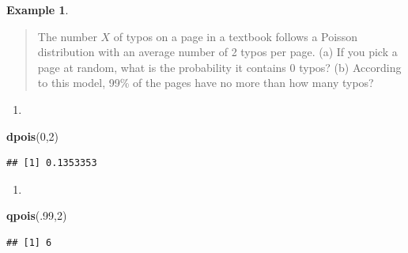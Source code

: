 \documentclass[
]{book}
\newenvironment{Shaded}{\begin{snugshade}}{\end{snugshade}}
\newcommand{\DecValTok}[1]{\textcolor[rgb]{0.00,0.00,0.81}{#1}}
\newcommand{\FunctionTok}[1]{\textcolor[rgb]{0.13,0.29,0.53}{\textbf{#1}}}
\newcommand{\NormalTok}[1]{#1}
\providecommand{\tightlist}{%
  \setlength{\itemsep}{0pt}\setlength{\parskip}{0pt}}
\theoremstyle{definition}
\theoremstyle{definition}
\newtheorem{example}{Example}[chapter]
\theoremstyle{definition}
\theoremstyle{definition}
\theoremstyle{remark}
\begin{document}
\begin{example}
\protect\hypertarget{exm:pois-typos-R}{}\label{exm:pois-typos-R}\leavevmode

\begin{quote}
The number \(X\) of typos on a page in a textbook follows a Poisson distribution with an average number of 2 typos per page. (a) If you pick a page at random, what is the probability it contains 0 typos? (b) According to this model, 99\% of the pages have no more than how many typos?
\end{quote}

\begin{enumerate}
\def\labelenumi{(\alph{enumi})}
\tightlist
\item
\end{enumerate}

\begin{Shaded}
\begin{Highlighting}[]
\FunctionTok{dpois}\NormalTok{(}\DecValTok{0}\NormalTok{,}\DecValTok{2}\NormalTok{)}
\end{Highlighting}
\end{Shaded}

\begin{verbatim}
## [1] 0.1353353
\end{verbatim}

\begin{enumerate}
\def\labelenumi{(\alph{enumi})}
\setcounter{enumi}{1}
\tightlist
\item
\end{enumerate}

\begin{Shaded}
\begin{Highlighting}[]
\FunctionTok{qpois}\NormalTok{(.}\DecValTok{99}\NormalTok{,}\DecValTok{2}\NormalTok{)}
\end{Highlighting}
\end{Shaded}

\begin{verbatim}
## [1] 6
\end{verbatim}

\end{example}
\end{document}
